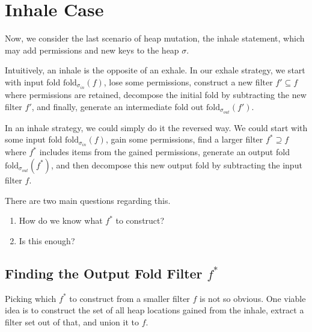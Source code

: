 \documentclass[msc,oneside]{ubcthesis}
\begin{document}
\section{Inhale Case}
Now, we consider the last scenario of heap mutation, the inhale statement, which may add permissions and new keys to the heap $\sigma$. 

Intuitively, an inhale is the opposite of an exhale. In our exhale strategy, we start with input fold $\textrm{fold}_{\sigma_{in}}(f)$, lose some permissions, construct a new filter $f' \subseteq f$ where permissions are retained, decompose the initial fold by subtracting the new filter $f'$, and finally, generate an intermediate fold out $\textrm{fold}_{\sigma_{out}}(f')$. 

In an inhale strategy, we could simply do it the reversed way. We could start with some input fold $\textrm{fold}_{\sigma_{in}}(f)$, gain some permissions, find a larger filter $f^* \supseteq f$ where $f^*$ includes items from the gained permissions, generate an output fold $\textrm{fold}_{\sigma_{out}}(f^*)$, and then decompose this new output fold by subtracting the input filter $f$.

There are two main questions regarding this.
\begin{enumerate}
    \item How do we know what $f^*$ to construct?
    \item Is this enough?
\end{enumerate}

\subsection{Finding the Output Fold Filter $f^*$}
Picking which $f^*$ to construct from a smaller filter $f$ is not so obvious. One viable idea is to construct the set of all heap locations gained from the inhale, extract a filter set out of that, and union it to $f$. 
\end{document}
